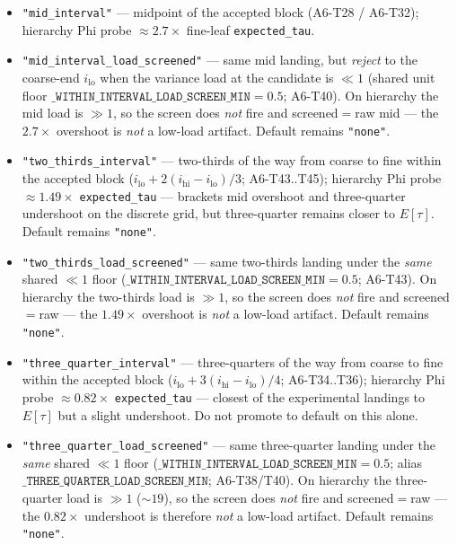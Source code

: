 \documentclass[11pt]{article}
\begin{document}
\begin{itemize}[leftmargin=1.5em]
  \item \texttt{"mid\_interval"} --- midpoint of the accepted block (A6-T28 /
  A6-T32); hierarchy Phi probe $\approx 2.7\times$ fine-leaf
  \texttt{expected\_tau}.
  \item \texttt{"mid\_interval\_load\_screened"} --- same mid landing, but
  \emph{reject} to the coarse-end $i_{\mathrm{lo}}$ when the variance load at
  the candidate is $\ll 1$ (shared unit floor
  $\texttt{\_WITHIN\_INTERVAL\_LOAD\_SCREEN\_MIN}{=}0.5$; A6-T40). On hierarchy
  the mid load is $\gg 1$, so the screen does \emph{not} fire and
  screened${=}$raw mid --- the $2.7\times$ overshoot is \emph{not} a low-load
  artifact. Default remains \texttt{"none"}.
  \item \texttt{"two\_thirds\_interval"} --- two-thirds of the way from coarse
  to fine within the accepted block
  ($i_{\mathrm{lo}}+2(i_{\mathrm{hi}}-i_{\mathrm{lo}})\!/\!3$; A6-T43..T45);
  hierarchy Phi probe $\approx 1.49\times$ \texttt{expected\_tau} --- brackets
  mid overshoot and three-quarter undershoot on the discrete grid, but
  three-quarter remains closer to $E[\tau]$. Default remains \texttt{"none"}.
  \item \texttt{"two\_thirds\_load\_screened"} --- same two-thirds landing under
  the \emph{same} shared $\ll 1$ floor
  ($\texttt{\_WITHIN\_INTERVAL\_LOAD\_SCREEN\_MIN}{=}0.5$; A6-T43). On hierarchy
  the two-thirds load is $\gg 1$, so the screen does \emph{not} fire and
  screened${=}$raw --- the $1.49\times$ overshoot is \emph{not} a low-load
  artifact. Default remains \texttt{"none"}.
  \item \texttt{"three\_quarter\_interval"} --- three-quarters of the way from
  coarse to fine within the accepted block
  ($i_{\mathrm{lo}}+3(i_{\mathrm{hi}}-i_{\mathrm{lo}})\!/\!4$; A6-T34..T36);
  hierarchy Phi probe $\approx 0.82\times$ \texttt{expected\_tau} --- closest
  of the experimental landings to $E[\tau]$ but a slight undershoot. Do not
  promote to default on this alone.
  \item \texttt{"three\_quarter\_load\_screened"} --- same three-quarter
  landing under the \emph{same} shared $\ll 1$ floor
  ($\texttt{\_WITHIN\_INTERVAL\_LOAD\_SCREEN\_MIN}{=}0.5$; alias
  $\texttt{\_THREE\_QUARTER\_LOAD\_SCREEN\_MIN}$; A6-T38/T40). On hierarchy
  the three-quarter load is $\gg 1$ ($\sim 19$), so the screen does
  \emph{not} fire and screened${=}$raw --- the $0.82\times$ undershoot is
  therefore \emph{not} a low-load artifact. Default remains \texttt{"none"}.

\end{itemize}
\end{document}
